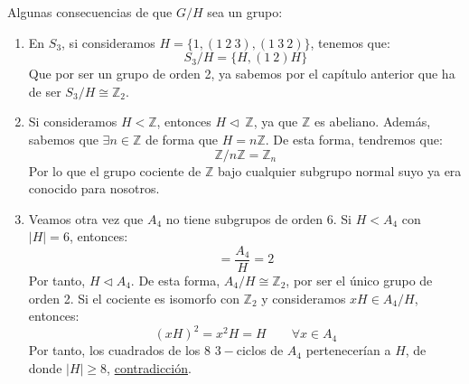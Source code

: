 \begin{ejemplo}
    Algunas consecuencias de que $G/H$ sea un grupo:
    \begin{enumerate}
        \item En $S_3$, si consideramos $H = \{1, (1\ 2\ 3), (1\ 3\ 2)\}$, tenemos que:
            \begin{equation*}
                S_3/H = \{H, (1\ 2)H\} 
            \end{equation*}
            Que por ser un grupo de orden 2, ya sabemos por el capítulo anterior que ha de ser $S_3/H\cong\mathbb{Z}_2$.
        \item Si consideramos $H<\mathbb{Z}$, entonces $H\lhd\ \mathbb{Z}$, ya que $\mathbb{Z}$ es abeliano. Además, sabemos que $\exists n\in \mathbb{Z}$ de forma que $H = n\mathbb{Z}$. De esta forma, tendremos que:
            \begin{equation*}
                \mathbb{Z}/n\mathbb{Z} = \mathbb{Z}_n
            \end{equation*}
            Por lo que el grupo cociente de $\mathbb{Z}$ bajo cualquier subgrupo normal suyo ya era conocido para nosotros.
        \item Veamos otra vez que $A_4$ no tiene subgrupos de orden 6. Si $H<A_4$ con $|H| = 6$, entonces:
            \begin{equation*}
                [A_4:H] = \dfrac{A_4}{H} = 2
            \end{equation*}
            Por tanto, $H\lhd A_4$. De esta forma, $A_4/H\cong \mathbb{Z}_2$, por ser el único grupo de orden 2. Si el cociente es isomorfo con $\mathbb{Z}_2$ y consideramos $xH\in A_4/H$, entonces:
            \begin{equation*}
                {(xH)}^{2} = x^2H = H \qquad \forall x\in A_4
            \end{equation*}
            Por tanto, los cuadrados de los 8 $3-$ciclos de $A_4$ pertenecerían a $H$, de donde $|H| \geq 8$, \underline{contradicción}.
    \end{enumerate}
\end{ejemplo}

